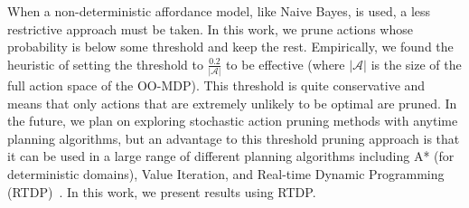 \documentclass[letterpaper]{article}
\begin{document}
When a non-deterministic affordance model, like Naive Bayes, is used,
a less restrictive approach must be taken. In this work,
we prune actions whose probability is below some threshold and
keep the rest. Empirically, we found the heuristic
of setting the threshold to $\frac{0.2}{|\mathcal{A}|}$ to
be effective (where $|\mathcal{A}|$ is the size
of the full action space of the OO-MDP). This threshold is
quite conservative and means that only actions
that are extremely unlikely to be optimal are pruned. 
In the future, we plan on exploring
stochastic action pruning methods with anytime planning
algorithms, but an advantage to this threshold pruning
approach is that it can be used in a large range of different
planning algorithms including A* (for deterministic domains),
Value Iteration, and Real-time
Dynamic Programming (RTDP)~\cite{barto95}. In this work, we present results 
using RTDP.



\end{document}
